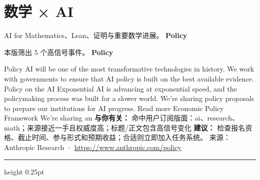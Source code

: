 \documentclass[10.5pt]{ctexart}
\begin{document}
\section*{数学 × AI}
{\color{ormuted} AI for Mathematics、Lean、证明与重要数学进展。}
\vspace{2mm}
{\LARGE\bfseries Policy}\par
\vspace{1mm}
{\color{ormuted} 本版筛出 5 个高信号事件。}
\vspace{3mm}
{\Large\bfseries Policy}\par
Policy AI will be one of the most transformative technologies in history. We work with governments to ensure that AI policy is built on the best available evidence. Policy on the AI Exponential AI is advancing at exponential speed, and the policymaking process was built for a slower world. We’re sharing policy proposals to prepare our institutions for AI progress. Read more Economic Policy Framework We’re sharing an 
\textbf{与你有关：} 命中用户订阅版面：ai、research、math；来源接近一手且权威度高；标题/正文包含高信号变化
\textbf{建议：} 检查报名资格、截止时间、参与形式和预期收益；合适则立即加入任务系统。
{\footnotesize\color{ormuted} 来源：Anthropic Research · \url{https://www.anthropic.com/policy}}
\vspace{4mm}
\hrule height 0.25pt
\vspace{3mm}
\end{document}
